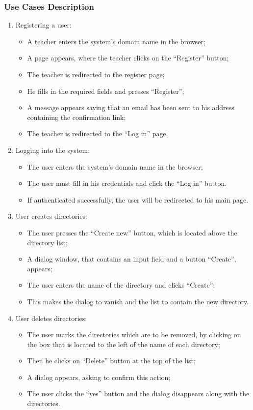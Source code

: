 \subsubsection{Use Cases Description}
\begin{enumerate}
  \item Registering a user:
  \begin{itemize}
    \item A teacher enters the system’s domain name in the browser;
    \item A page appears, where the teacher clicks on the “Register” button;
    \item The teacher is redirected to the register page;
    \item He fills in the required fields and presses “Register”;
    \item A message appears saying that an email has been sent to his address containing the confirmation link;
    \item The teacher is redirected to the “Log in” page.
  \end{itemize}

  \item Logging into the system:
  \begin{itemize}
    \item The user enters the system’s domain name in the browser;
    \item The user must fill in his credentials and click the “Log in” button. 
    \item If authenticated successfully, the user will be redirected to his main page.
  \end{itemize}

  \item User creates directories:
  \begin{itemize}
    \item The user presses the “Create new” button, which is located above the directory list;
    \item A dialog window, that contains an input field and a button “Create”, appears;
    \item The user enters the name of  the directory and clicks “Create”;
    \item This makes the dialog to vanish and the list to contain the new directory.
  \end{itemize}

  \item User deletes directories:
  \begin{itemize}
    \item The user marks the directories which are to be removed, by clicking on the box that is located to the left of the name of each directory; 
    \item Then he clicks on “Delete” button at the top of the list;
    \item A dialog appears, asking to confirm this action;
    \item The user clicks the “yes” button and the dialog disappears along with the directories.
  \end{itemize}


\end{enumerate}
